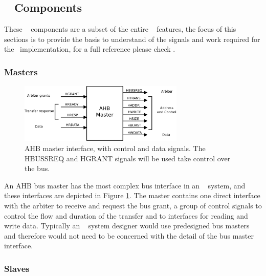 \subsection{\amba~ Components}
These \amba~ components are a  subset of the entire \amba~ features, the focus of this sections is to provide the basis to understand of the signals and work required for the \cshia~implementation, for a full reference please check \cite{ARMAMBA2}.

\subsubsection{Masters}
\begin{figure}[!ht]
    \centering
    \includegraphics[width=0.7\textwidth]{figures/pdf/ahb_master_new.pdf}
    \caption{AHB master interface, with control and data signals. The HBUSSREQ and HGRANT signals  will be used take control over the bus.}
    \label{fig:masterint}
\end{figure}

 An AHB bus master has the most complex bus interface in an \amba~ system, and these interfaces are depicted in Figure \ref{fig:masterint}. The master contains one direct interface with the arbiter to receive and request the bus grant, a group of control signals to control the flow and duration of the transfer and to interfaces for reading and write data.  Typically an \amba~ system designer would use predesigned bus masters and therefore would not need to be concerned with the detail of the bus master interface.



\subsubsection{Slaves}

